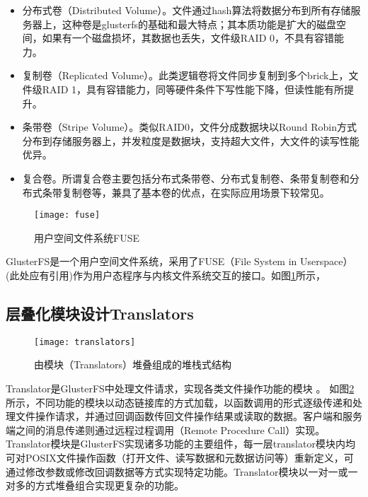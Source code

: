 \begin{itemize}
    \item 分布式卷（Distributed Volume）。文件通过hash算法将数据分布到所有存储服务器上，这种卷是glusterfs的基础和最大特点；其本质功能是扩大的磁盘空间，如果有一个磁盘损坏，其数据也丢失，文件级RAID 0，不具有容错能力。
    \item 复制卷（Replicated Volume）。此类逻辑卷将文件同步复制到多个brick上，文件级RAID 1，具有容错能力，同等硬件条件下写性能下降，但读性能有所提升。
    \item 条带卷（Stripe Volume）。类似RAID0，文件分成数据块以Round Robin方式分布到存储服务器上，并发粒度是数据块，支持超大文件，大文件的读写性能优异。
    \item 复合卷。所谓复合卷主要包括分布式条带卷、分布式复制卷、条带复制卷和分布式条带复制卷等，兼具了基本卷的优点，在实际应用场景下较常见。
\end{itemize}
\begin{figure}[htp]
\centering
\texttt{[image: fuse]}
\caption{用户空间文件系统FUSE}
\label{fig:fuse}
\end{figure}
GlusterFS是一个用户空间文件系统，采用了FUSE（File System in Userspace）{\color{red}(此处应有引用)}作为用户态程序与内核文件系统交互的接口。如图\ref{fig:fuse}所示，

\subsection{层叠化模块设计Translators}
\begin{figure}[htp]
\centering
\texttt{[image: translators]}
\caption{由模块（Translators）堆叠组成的堆栈式结构}
\label{fig:translators}
\end{figure}
Translator是GlusterFS中处理文件请求，实现各类文件操作功能的模块
\cite{BWFS}\cite{DPFS}。
如图\ref{fig:translators}所示，不同功能的模块以动态链接库的方式加载，以函数调用的形式逐级传递和处理文件操作请求，并通过回调函数传回文件操作结果或读取的数据。客户端和服务端之间的消息传递则通过远程过程调用（Remote Procedure Call）实现。
Translator模块是GlusterFS实现诸多功能的主要组件，每一层translator模块内均可对POSIX文件操作函数（打开文件、读写数据和元数据访问等）重新定义，可通过修改参数或修改回调数据等方式实现特定功能。Translator模块以一对一或一对多的方式堆叠组合实现更复杂的功能。

